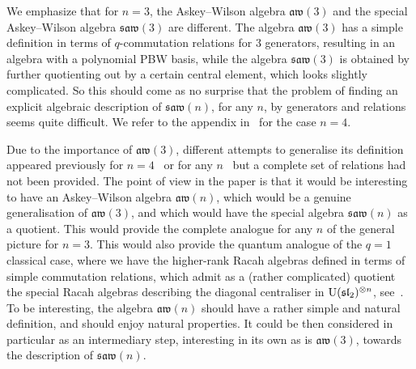 \documentclass[pdftex]{sigma}
\numberwithin{equation}{section}
\theoremstyle{definition}
\newcommand{\aw}{\mathfrak{aw}(n)}
\newcommand{\saw}{\mathfrak{saw}(n)}
\begin{document}
We emphasize that for $n=3$, the Askey--Wilson algebra $\mathfrak{aw}(3)$ and the special Askey--Wilson algebra $\mathfrak{saw}(3)$ are different.
The algebra $\mathfrak{aw}(3)$ has a simple definition in terms of $q$-commutation relations for 3 generators, resulting in an algebra with a polynomial PBW basis,
while the algebra $\mathfrak{saw}(3)$ is obtained by further quotienting out by a certain central element, which looks slightly complicated.
So this should come as no surprise that the problem of finding an explicit algebraic description of $\saw$, for any $n$, by generators and relations seems quite difficult.
We refer to the appendix in~\cite{CL} for the case $n=4$.

Due to the importance of $\mathfrak{aw}(3)$, different attempts to generalise its definition appeared previously for $n=4$~\cite{GW, PostWalt} or for any $n$~\cite{dBdC,dBdCvdV, DeC} but a complete set of relations had not been provided.
The point of view in the paper is that it would be interesting to have an Askey--Wilson algebra $\aw$,
which would be a genuine generalisation of $\mathfrak{aw}(3)$, and which would have the special algebra $\saw$ as a quotient.
This would provide the complete analogue for any $n$ of the general picture for $n=3$. This would also provide the quantum analogue of the $q=1$ classical case, where we have the higher-rank Racah algebras defined in terms of simple commutation relations, which admit as a (rather complicated) quotient the special Racah algebras describing the diagonal centraliser in ${\rm U}(\mathfrak{sl}_2)^{\otimes n}$, see~\cite{CGPV}. To be interesting, the algebra $\aw$ should have a rather simple and natural definition, and should enjoy natural properties. It could be then considered in particular as an intermediary step, interesting in its own as is $\mathfrak{aw}(3)$, towards the description of $\saw$.
\end{document}
